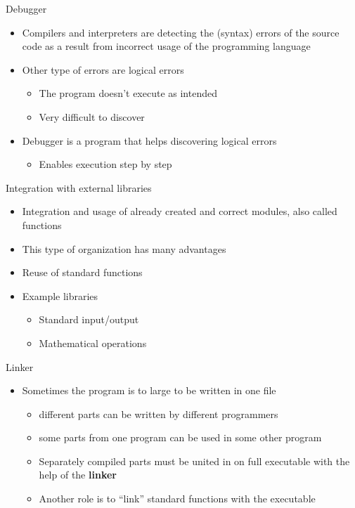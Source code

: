 \begin{frame}{Debugger}
\begin{itemize}
  \item Compilers and interpreters are detecting the (syntax) errors of the
  source code as a result from incorrect usage of the programming language
  \item Other type of errors are logical errors
  \begin{itemize}
  \item The program doesn't execute as intended
  \item Very difficult to discover
  \end{itemize}
  \item Debugger is a program that helps discovering logical errors
  \begin{itemize}
  \item Enables execution step by step
  \end{itemize}
\end{itemize}
\end{frame}

\begin{frame}{Integration with external libraries}
\begin{itemize}
  \item Integration and usage of already created and correct modules,
  also called functions
  \item This type of organization has many advantages
  \item Reuse of standard functions
  \item Example libraries
  \begin{itemize}
    \item Standard input/output
    \item Mathematical operations 
  \end{itemize}
\end{itemize}
\end{frame}

\begin{frame}{Linker}
\begin{itemize}
  \item Sometimes the program is to large to be written in one file
  \begin{itemize}
    \item different parts can be written by different programmers
    \item some parts from one program can be used in some other program
    \item Separately compiled parts must be united in on full executable with
    the help of the \textbf{linker}
    \item Another role is to ``link'' standard functions with the executable
  \end{itemize}
\end{itemize}

\end{frame}

